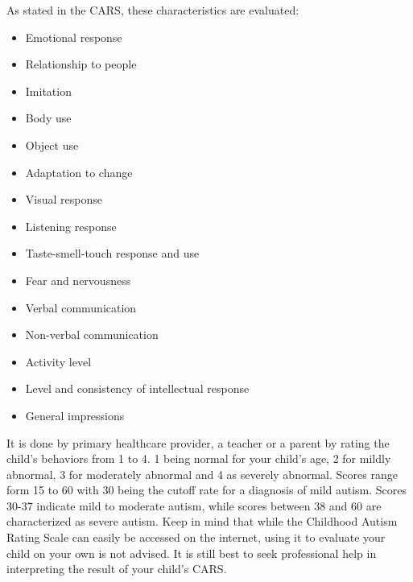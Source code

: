 As stated in the CARS, these characteristics are evaluated:
\begin{itemize}
  \item Emotional response
  \item Relationship to people
  \item Imitation
  \item Body use
  \item Object use
  \item Adaptation to change
  \item Visual response
  \item  Listening response
  \item Taste-smell-touch response and use
  \item Fear and nervousness
  \item Verbal communication
  \item Non-verbal communication
  \item Activity level
  \item Level and consistency of intellectual response
  \item General impressions
\end{itemize}
It is done by primary healthcare provider, a teacher or a parent by rating the child’s behaviors from 1 to 4. 1 being normal for your child’s age, 2 for mildly abnormal, 3 for moderately abnormal and 4 as severely abnormal. Scores range form 15 to 60 with 30 being the cutoff rate for a diagnosis of mild autism. Scores 30-37 indicate mild to moderate autism, while scores between 38 and 60 are characterized as severe autism. Keep in mind that while the Childhood Autism Rating Scale can easily be accessed on the internet, using it to evaluate your child on your own is not advised. It is still best to seek professional help in interpreting the result of your child’s CARS.

